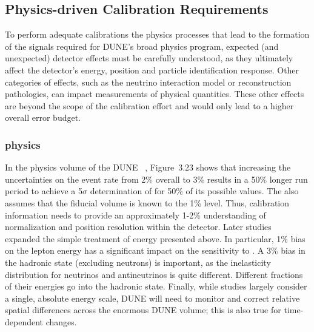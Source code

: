 \begin{comment}
Under current assumptions, the calibration strategy described in this document is applicable to both \dwords{spmod} and \dwords{dpmod}. Sections~\ref{sec:phys-calib-req} and \ref{sec:phys-calib-approach} briefly describe the physics-driven calibration requirements, including the calibration sources and the systems required at the different stages of the experiment. The nominal \dword{dune} \dword{fd} calibration design is described in Section~\ref{sec:phys-calib-sources}. Finally, Section~\ref{sec:phys-calib-sum} provides a summary along with future plans for calibration.
\end{comment}



\subsection{Physics-driven Calibration Requirements}
\label{sec:phys-calib-req}


To perform adequate calibrations the physics processes that lead to the formation of the signals required for DUNE's broad physics program,
expected (and unexpected) detector effects must be carefully understood, as they ultimately affect the detector's energy, position and particle identification response. 
Other categories of effects, such as the neutrino interaction model or reconstruction pathologies, can impact measurements of physical quantities. These other effects are beyond the scope of the  calibration effort and would only lead to a higher overall error budget.

\subsubsection{ physics}
\label{sec:phys-calib-lbl}
In the physics volume of the DUNE ~\cite{Acciarri:2015uup}, Figure~3.23 shows that increasing the uncertainties on the \nue event rate from \num{2}\% overall to \num{3}\% results in a \num{50}\% longer run period to achieve a 5$\sigma$ determination of  for 50\% of its possible values. 
The  also assumes that the fiducial volume is known to the 1\% level. Thus, calibration information needs to provide an approximately 1-2\% understanding of normalization 
and position resolution within the detector. Later studies~\cite{ebias} expanded the simple treatment of energy  presented above. In particular, \num{1}\% bias on the lepton energy has a significant impact on the sensitivity to . 
%
A \num{3}\% bias in the hadronic state (excluding neutrons) is important, as the inelasticity  distribution for neutrinos and antineutrinos is quite different.  Different fractions of their energies go into the hadronic state. Finally, while studies largely consider a single, absolute energy scale, DUNE will need to monitor and correct relative spatial differences across the enormous DUNE  volume; this is also true for time-dependent changes. 

